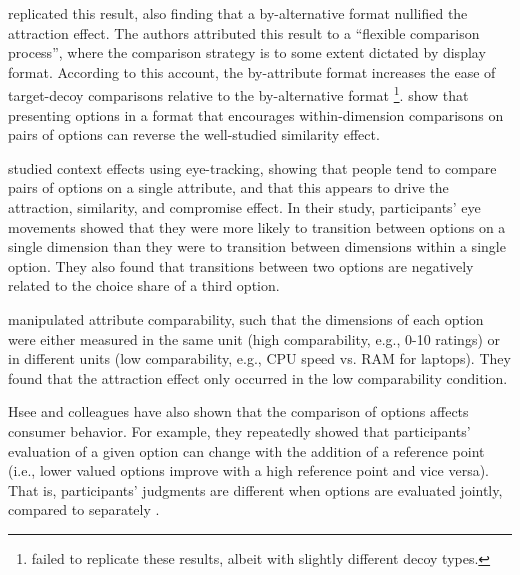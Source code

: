 \textcite{cataldoComparisonProcessAccount2019b} replicated this result, also finding that a by-alternative format nullified the attraction effect. The authors attributed this result to a “flexible comparison process”, where the comparison strategy is to some extent dictated by display format. According to this account, the by-attribute format increases the ease of target-decoy comparisons relative to the by-alternative format \footnote{\textcite{hasan2025registered} failed to replicate these results, albeit with slightly different decoy types.}. \textcite{cataldoReversingSimilarityEffect2018b} show that presenting options in a format that encourages within-dimension comparisons on pairs of options can reverse the well-studied similarity effect.

\textcite{noguchi2014attraction} studied context effects using eye-tracking, showing that people tend to compare pairs of options on a single attribute, and that this appears to drive the attraction, similarity, and compromise effect. In their study, participants' eye movements showed that they were more likely to transition between options on a single dimension than they were to transition between dimensions within a single option. They also found that transitions between two options are negatively related to the choice share of a third option.

\textcite{hayes2024attribute} manipulated attribute comparability, such that the dimensions of each option were either measured in the same unit (high comparability, e.g., 0-10 ratings) or in different units (low comparability, e.g., CPU speed vs. RAM for laptops). They found that the attraction effect only occurred in the low comparability condition. 

Hsee and colleagues \parencite{hseeEvaluabilityHypothesisExplanation1996,hseeLessBetterWhen1998,hseeWillProductsLook1998,hsee1999preference} have also shown that the comparison of options affects consumer behavior. For example, they repeatedly showed that participants’ evaluation of a given option can change with the addition of a reference point (i.e., lower valued options improve with a high reference point and vice versa). That is, participants’ judgments are different when options are evaluated jointly, compared to separately \parencite{hsee1999preference}. 

